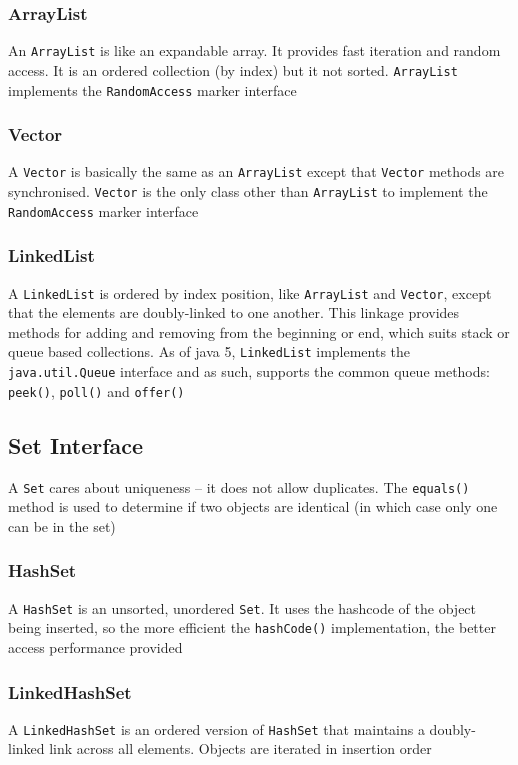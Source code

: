 \subsubsection{ArrayList}
An \verb#ArrayList# is like an expandable array. It provides fast iteration and 
random access. It is an ordered collection (by index) but it not sorted.  
\verb#ArrayList# implements the \verb#RandomAccess# marker interface

\subsubsection{Vector}
A \verb#Vector# is basically the same as an \verb#ArrayList# except that 
\verb#Vector# methods are synchronised. \verb#Vector# is the only class other 
than \verb#ArrayList# to implement the \verb#RandomAccess# marker interface

\subsubsection{LinkedList}
A \verb#LinkedList# is ordered by index position, like \verb#ArrayList# and 
\verb#Vector#, except that the elements are doubly-linked to one another. This 
linkage provides methods for adding and removing from the beginning or end, 
which suits stack or queue based collections. As of java 5, \verb#LinkedList# 
implements the \verb#java.util.Queue# interface and as such, supports the 
common queue methods: \verb#peek()#, \verb#poll()# and \verb#offer()#

\subsection{Set Interface}
A \verb#Set# cares about uniqueness -- it does not allow duplicates. The 
\verb#equals()# method is used to determine if two objects are identical (in 
which case only one can be in the set)

\subsubsection{HashSet}
A \verb#HashSet# is an unsorted, unordered \verb#Set#. It uses the hashcode of 
the object being inserted, so the more efficient the \verb#hashCode()# 
implementation, the better access performance provided

\subsubsection{LinkedHashSet}
A \verb#LinkedHashSet# is an ordered version of \verb#HashSet# that maintains a 
doubly-linked link across all elements. Objects are iterated in insertion order

